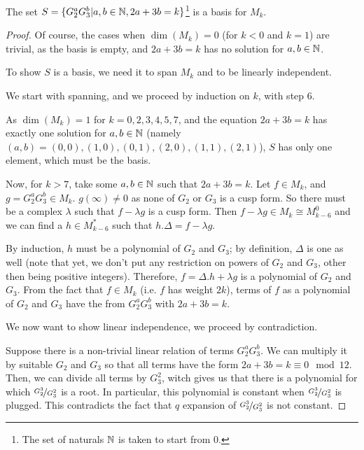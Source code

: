 \begin{theorem}
    The set $S = \{G_2^aG_3^b | a,b \in \mathbb{N}, 2a+3b = k\}$\footnote{The set of naturals $\mathbb{N}$ is taken to start from $0$.} is a basis for $M_k$.\cite[Theorem 2.17]{ModularFormsComputationalApproach}
\end{theorem}
\begin{proof}
    Of course, the cases when $\dim(M_k)=0$ (for $k<0$ and $k=1$) are trivial, as the basis is empty, and $2a+3b = k$ has no solution for $a,b \in \mathbb{N}$.
    
    To show $S$ is a basis, we need it to span $M_k$ and to be linearly independent.
    
    We start with spanning, and we proceed by induction on $k$, with step $6$.
    
    As $\dim(M_k)=1$ for $k=0,2,3,4,5,7$, and the equation $2a+3b = k$ has exactly one solution for $a,b \in \mathbb{N}$ (namely $(a,b)=(0,0), (1,0), (0,1), (2,0), (1,1), (2,1)$), $S$ has only one element, which must be the basis.
    
    Now, for $k>7$, take some $a,b \in \mathbb{N}$ such that $2a+3b=k$. Let $f \in M_k$, and $g = G_2^aG_3^b \in M_k$.
    $g(\infty) \neq 0$ as none of $G_2$ or $G_3$ is a cusp form. 
    So there must be a complex $\lambda$ such that $f - \lambda g$ is a cusp form. 
    Then $f - \lambda g \in M_k \cong M_{k-6}^0$ and we can find a $h \in M_{k-6}^*$ such that $h.\varDelta=f - \lambda g$.
    
    By induction, $h$ must be a polynomial of $G_2$ and $G_3$; by definition, $\varDelta$ is one as well (note that yet, we don't put any restriction on powers of $G_2$ and $G_3$, other then being positive integers).
    Therefore, $f = \varDelta.h + \lambda g$ is a polynomial of $G_2$ and $G_3$.
    From the fact that $f \in M_k$ (i.e. $f$ has weight $2k$), terms of $f$ as a polynomial of $G_2$ and $G_3$ have the from $G_2^aG_3^b$ with $2a+3b=k$.
    
    We now want to show linear independence, we proceed by contradiction.
    
    Suppose there is a non-trivial linear relation of terms $G_2^aG_3^b$. 
    We can multiply it by suitable $G_2$ and $G_3$ so that all terms have the form $2a+3b = k \equiv 0 \mod 12$.
    Then, we can divide all terms by $G_3^2$, witch gives us that there is a polynomial for which $\nicefrac{G_2^3}{G_3^2}$ is a root.
    In particular, this polynomial is constant when $\nicefrac{G_2^3}{G_3^2}$ is plugged.
    This contradicts the fact that $q$ expansion of $\nicefrac{G_2^3}{G_3^2}$ is not constant.
\end{proof}

